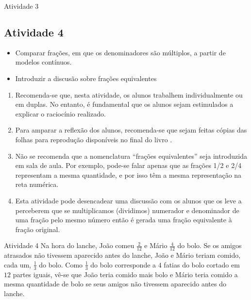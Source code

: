 \begin{multicols}{2}
\begin{resposta*}{Atividade 3}
\end{resposta*}



\subsection{Atividade 4}

\begin{itemize} %
    \item       Comparar frações, em que os denominadores são múltiplos, a 
partir de modelos contínuos.
    \item       Introduzir a discusão sobre frações equivalentes    
\end{itemize} %
  
      
 
\begin{enumerate} [\quad a)] %
    \item       Recomenda-se que, nesta atividade, os alunos trabalhem 
individualmente ou em duplas. No entanto, é fundamental que os alunos sejam 
estimulados a explicar o raciocínio realizado.
    \item       Para amparar a reflexão dos alunos, recomenda-se que sejam 
feitas cópias das             folhas para reprodução disponíveis no final do 
livro      .
    \item       Não se recomenda que a nomenclatura       ``frações 
equivalentes''       seja introduzida em sala de aula. Por exemplo, pode-se 
falar apenas que as frações 1/2 e 2/4 representam a mesma quantidade, e por isso 
têm a mesma representação na reta numérica.
    \item       Esta atividade pode desencadear uma discussão com os alunos que 
os leve a perceberem que se multiplicamos (dividimos) numerador e denominador de 
uma fração pelo mesmo número então é gerada uma fração equivalente à fração 
original.
\end{enumerate} %
  
\begin{resposta*}{Atividade 4}  
  Na hora do lanche, João comeu   $\frac{2}{12}$   e Mário   $\frac{4}{12}$   do 
bolo. Se os amigos atrasados não tivessem aparecido antes do lanche, João e 
Mário teriam comido, cada um,   $\frac{1}{3}$   do bolo. Como   $\frac{1}{3}$   
do bolo corresponde a   $4$   fatias do bolo cortado em   $12$   partes iguais, 
vê-se que João teria comido mais bolo e Mário teria comido a mesma quantidade de 
bolo se seus amigos não tivessem aparecido antes do lanche.  
\end{resposta*}


\end{multicols}
